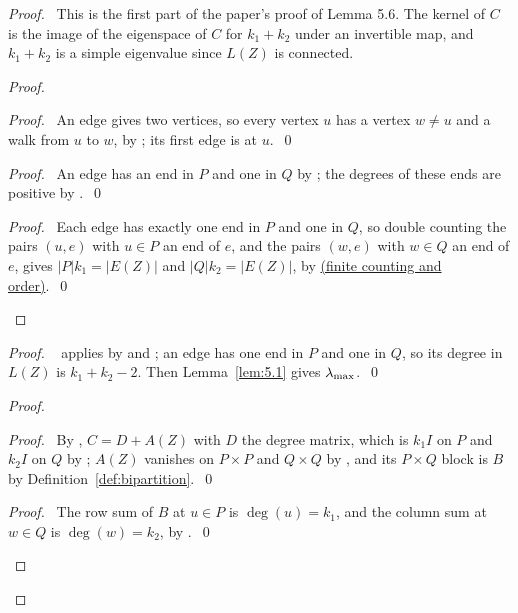 \begin{proof}
 \pfsketch\ This is the first part of the paper's proof of Lemma 5.6. The kernel of $C$ is the
 image of the eigenspace of $C$ for $k_1+k_2$ under an invertible map, and $k_1+k_2$ is a simple
 eigenvalue since $L(Z)$ is connected.
 \begin{proof}
  \begin{proof}\pf\ An edge gives two vertices, so every vertex $u$ has a vertex $w\ne u$ and a
   walk from $u$ to $w$, by ; its first edge is at $u$.~\qed\end{proof}
  \begin{proof}\pf\ An edge has an end in $P$ and one in $Q$ by ; the degrees of
   these ends are positive by .~\qed\end{proof}
  \qedstep
  \begin{proof}\pf\ Each edge has exactly one end in $P$ and one in $Q$, so double counting the
   pairs $(u,e)$ with $u\in P$ an end of $e$, and the pairs $(w,e)$ with $w\in Q$ an end of $e$,
   gives $|P|k_1=|E(Z)|$ and $|Q|k_2=|E(Z)|$, by
   \hyperref[hc:facts:finite]{(finite counting and order)}.~\qed\end{proof}
 \end{proof}
 \begin{proof}\pf\  applies by  and ; an edge has one
  end in $P$ and one in $Q$, so its degree in $L(Z)$ is $k_1+k_2-2$. Then
  Lemma~\ref{lem:5.1} gives $\lambda_{\max}$.~\qed\end{proof}
 \begin{proof}
  \begin{proof}\pf\ By , $C=D+A(Z)$ with $D$ the degree matrix, which is $k_1I$
   on $P$ and $k_2I$ on $Q$ by ; $A(Z)$ vanishes on $P\times P$ and $Q\times Q$ by
   , and its $P\times Q$ block is $B$ by Definition~\ref{def:bipartition}.~\qed\end{proof}
  \begin{proof}\pf\ The row sum of $B$ at $u\in P$ is $\deg(u)=k_1$, and the column sum at $w\in
   Q$ is $\deg(w)=k_2$, by .~\qed\end{proof}

\end{proof}
\end{proof}
